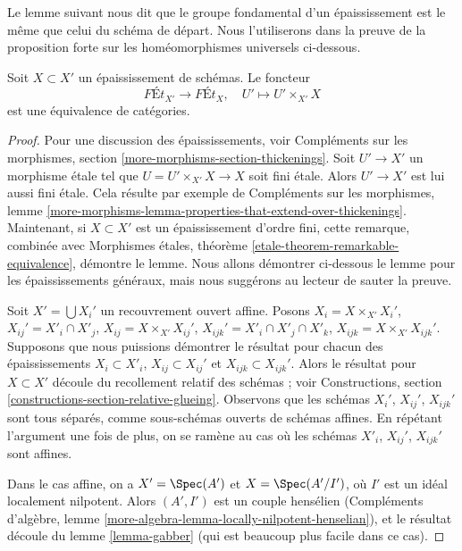 \noindent
Le lemme suivant nous dit que le groupe fondamental d'un épaississement
est le même que celui du schéma de départ. Nous l'utiliserons
dans la preuve de la proposition forte sur les homéomorphismes universels
ci-dessous.

\begin{lemma}
\label{lemma-thickening}
Soit $X \subset X'$ un épaississement de schémas. Le foncteur
$$
\textit{F\'Et}_{X'} \longrightarrow \textit{F\'Et}_X,\quad
U' \longmapsto U' \times_{X'} X
$$
est une équivalence de catégories.
\end{lemma}

\begin{proof}
Pour une discussion des épaississements, voir
Compléments sur les morphismes, section \ref{more-morphisms-section-thickenings}.
Soit $U' \to X'$ un morphisme étale tel que $U = U' \times_{X'} X \to X$
soit fini étale. Alors $U' \to X'$ est lui aussi fini étale.
Cela résulte par exemple de Compléments sur les morphismes, lemme
\ref{more-morphisms-lemma-properties-that-extend-over-thickenings}.
Maintenant, si $X \subset X'$ est un épaississement d'ordre fini, cette remarque,
combinée avec Morphismes étales, théorème
\ref{etale-theorem-remarkable-equivalence},
démontre le lemme. Nous allons démontrer ci-dessous le lemme pour les épaississements
généraux, mais nous suggérons au lecteur de sauter la preuve.

\medskip\noindent
Soit $X' = \bigcup X_i'$ un recouvrement ouvert affine. Posons
$X_i = X \times_{X'} X_i'$, $X_{ij}' = X'_i \cap X'_j$,
$X_{ij} = X \times_{X'} X_{ij}'$, $X_{ijk}' = X'_i \cap X'_j \cap X'_k$,
$X_{ijk} = X \times_{X'} X_{ijk}'$.
Supposons que nous puissions démontrer
le résultat pour chacun des épaississements
$X_i \subset X'_i$, $X_{ij} \subset X_{ij}'$ et $X_{ijk} \subset X_{ijk}'$.
Alors le résultat pour $X \subset X'$ découle du recollement relatif des
schémas ; voir
Constructions, section \ref{constructions-section-relative-glueing}.
Observons que les schémas $X_i'$, $X_{ij}'$, $X_{ijk}'$ sont
tous séparés, comme sous-schémas ouverts de schémas affines. En répétant
l'argument une fois de plus, on se ramène au cas où les schémas
$X'_i$, $X_{ij}'$, $X_{ijk}'$ sont affines.

\medskip\noindent
Dans le cas affine, on a $X' = \Spec(A')$ et $X = \Spec(A'/I')$,
où $I'$ est un idéal localement nilpotent. Alors $(A', I')$ est un
couple hensélien (Compléments d'algèbre, lemme
\ref{more-algebra-lemma-locally-nilpotent-henselian}),
et le résultat découle du lemme \ref{lemma-gabber} (qui est
beaucoup plus facile dans ce cas).
\end{proof}

